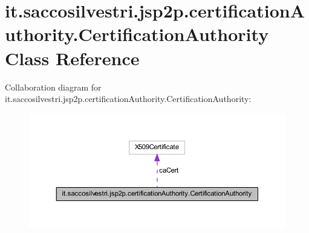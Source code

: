 \hypertarget{classit_1_1saccosilvestri_1_1jsp2p_1_1certification_authority_1_1_certification_authority}{
\section{it.saccosilvestri.jsp2p.certification\-Authority.\-Certification\-Authority \-Class \-Reference}
\label{classit_1_1saccosilvestri_1_1jsp2p_1_1certification_authority_1_1_certification_authority}
}


\-Collaboration diagram for it.saccosilvestri.jsp2p.certification\-Authority.\-Certification\-Authority\-:
\nopagebreak
\begin{figure}[H]
\begin{center}
\leavevmode
\includegraphics[width=350pt]{classit_1_1saccosilvestri_1_1jsp2p_1_1certification_authority_1_1_certification_authority__coll__graph}
\end{center}
\end{figure}
